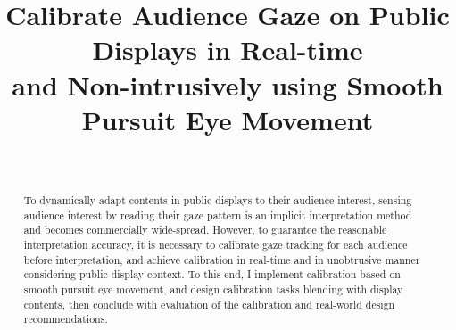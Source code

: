 \documentclass{sigchi}
\begin{document}
\title{Calibrate Audience Gaze on Public Displays in Real-time \\and Non-intrusively using Smooth Pursuit Eye Movement}

\author{%
  \\
}

\maketitle

\begin{abstract}
To dynamically adapt contents in public displays to their audience interest, sensing audience interest by reading their gaze pattern is an implicit interpretation method and becomes commercially wide-spread. However, to guarantee the reasonable interpretation accuracy, it is necessary to calibrate gaze tracking for each audience before interpretation, and achieve calibration in real-time and in unobtrusive manner considering public display context. To this end, I implement calibration based on smooth pursuit eye movement, and design calibration tasks blending with display contents, then conclude with evaluation of the calibration and real-world design recommendations.
\end{abstract}


\end{document}
